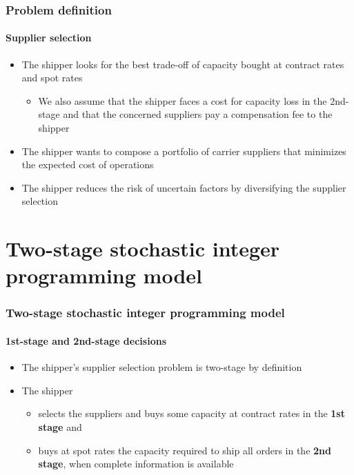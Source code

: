 \documentclass[9pt,xcolor={dvipsnames}]{beamer}
\begin{document}
\begin{frame}%
	\frametitle{Problem definition}
	\framesubtitle{Supplier selection}
	\begin{itemize}
		\item<1-> The shipper looks for the best trade-off of capacity bought at contract rates and spot rates
		\begin{itemize}
			\footnotesize
			\item<2-> We also assume that the shipper faces a cost for capacity loss in the 2nd-stage and that the concerned suppliers pay a compensation fee to the shipper
		\end{itemize}
		\bigskip
		\item<3-> The shipper wants to compose a portfolio of carrier suppliers that minimizes the expected cost of operations
		\bigskip
		\item<4-> The shipper reduces the risk of uncertain factors by diversifying the supplier selection
	\end{itemize}
\end{frame}

\section{Two-stage stochastic integer programming model}
\begin{frame}%
	\frametitle{Two-stage stochastic integer programming model}
	\framesubtitle{1st-stage and 2nd-stage decisions}
	\begin{itemize}
		\item<1-> The shipper's supplier selection problem is two-stage by definition
		\bigskip
		\item<2-> The shipper
		\bigskip
		\begin{itemize}
		\item<2-> selects the suppliers and buys some capacity at contract rates in the \textbf{1st stage} and
		\bigskip
		\item<3-> buys at spot rates the capacity required to ship all orders in the \textbf{2nd stage}, when complete information is available
		\end{itemize}
	\end{itemize}
\end{frame}
\end{document}
